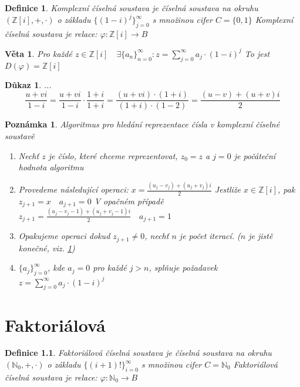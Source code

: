 \documentclass[12pt]{book}
\newtheorem{definice}{Definice}
\newtheorem{veta}{Věta}
\newtheorem*{dukaz}{Důkaz}
\newtheorem{pozn}{Poznámka}
\begin{document}
\begin{definice}
	Komplexní číselná soustava je číselná soustava na okruhu $(\mathbb{Z}[i],+,\cdot)$ o základu $\{(1-i)^j\}_{j=0}^\infty$ s množinou cifer $C=\{0,1\}$\newline
	\newline
	Komplexní číselná soustava je relace:
	$\varphi:\mathbb{Z}[i]\to B$
\end{definice}

\begin{veta}
	Pro každé $z \in \mathbb{Z}[i] \quad \exists\{a_n\}_{n=0}^\infty:z=
	\sum_{j=0}^{\infty}a_j\cdot(1-i)^j$
	To jest $D(\varphi)=\mathbb{Z}[i]$
\end{veta}
\begin{dukaz}\label{kompDF}
	...
	$$\frac{u+vi}{1-i}=\frac{u+vi}{1-i}\cdot\frac{1+i}{1+i} = \frac{(u+vi)\cdot(1+i)}{(1+i)\cdot(1-2)}=\frac{(u-v)+(u+v)i}{2}$$
\end{dukaz}
\begin{pozn} Algoritmus pro hledání reprezentace čísla v komplexní číselné soustavě
	\begin{enumerate}
		\item Nechť $z$ je číslo, které chceme reprezentovat, $z_0 = z$ a $j=0$ je počáteční hodnota algoritmu	
		\item Provedeme následující operaci:\newline
		$x = \frac{(u_j-v_j)+(u_j+v_j)i}{2}$\newline
		Jestliže $x \in \mathbb{Z}[i]$, pak $z_{j+1} = x \quad a_{j+1}=0$\newline
		V opačném případě $z_{j+1} = \frac{(u_j-v_j-1)+(u_j+v_j-1)i}{2}\quad a_{j+1}=1$
		\item Opakujeme operaci dokud $z_{j+1}\ne0$, nechť $n$ je počet iterací. ($n$ je jistě konečné, viz. \ref{kompDF})
		\item $\{a_j\}_{j=0}^{\infty}$, kde $a_j=0$ pro každé $j>n$, splňuje požadavek $z=
		\sum_{j=0}^{\infty}a_j\cdot(1-i)^j$
	\end{enumerate}
\end{pozn}


\chapter{Faktoriálová}

\begin{definice}
	Faktoriálová číselná soustava je číselná soustava na okruhu $(\mathbb{N}_0,+,\cdot)$ o základu $\{(i+1)!\}_{i=0}^\infty$ s množinou cifer $C=\mathbb{N}_0$\newline
	\newline
	Faktoriálová číselná soustava je relace:
	$\varphi:\mathbb{N}_0\to B$
\end{definice}
\end{document}
